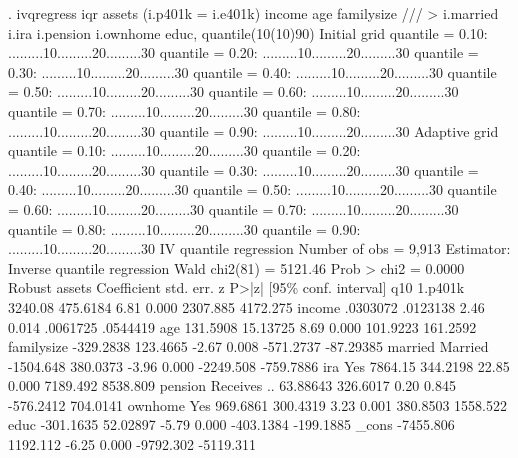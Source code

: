 . ivqregress iqr assets (i.p401k = i.e401k) income age familysize         ///
>         i.married i.ira i.pension i.ownhome educ, quantile(10(10)90)
{\smallskip}
Initial grid
    quantile = 0.10: .........10.........20.........30
    quantile = 0.20: .........10.........20.........30
    quantile = 0.30: .........10.........20.........30
    quantile = 0.40: .........10.........20.........30
    quantile = 0.50: .........10.........20.........30
    quantile = 0.60: .........10.........20.........30
    quantile = 0.70: .........10.........20.........30
    quantile = 0.80: .........10.........20.........30
    quantile = 0.90: .........10.........20.........30
{\smallskip}
Adaptive grid
    quantile = 0.10: .........10.........20.........30
    quantile = 0.20: .........10.........20.........30
    quantile = 0.30: .........10.........20.........30
    quantile = 0.40: .........10.........20.........30
    quantile = 0.50: .........10.........20.........30
    quantile = 0.60: .........10.........20.........30
    quantile = 0.70: .........10.........20.........30
    quantile = 0.80: .........10.........20.........30
    quantile = 0.90: .........10.........20.........30
{\smallskip}
IV quantile regression                                 Number of obs =   9,913
Estimator: Inverse quantile regression                 Wald chi2(81) = 5121.46
                                                       Prob > chi2   =  0.0000
{\smallskip}
             {\VBAR}               Robust
      assets {\VBAR} Coefficient  std. err.      z    P>|z|     [95\% conf. interval]
q10          {\VBAR}
     1.p401k {\VBAR}    3240.08   475.6184     6.81   0.000     2307.885    4172.275
      income {\VBAR}   .0303072   .0123138     2.46   0.014     .0061725    .0544419
         age {\VBAR}   131.5908   15.13725     8.69   0.000     101.9223    161.2592
  familysize {\VBAR}  -329.2838   123.4665    -2.67   0.008    -571.2737   -87.29385
             {\VBAR}
     married {\VBAR}
    Married  {\VBAR}  -1504.648   380.0373    -3.96   0.000    -2249.508   -759.7886
             {\VBAR}
         ira {\VBAR}
        Yes  {\VBAR}    7864.15   344.2198    22.85   0.000     7189.492    8538.809
             {\VBAR}
     pension {\VBAR}
Receives ..  {\VBAR}   63.88643   326.6017     0.20   0.845    -576.2412    704.0141
             {\VBAR}
     ownhome {\VBAR}
        Yes  {\VBAR}   969.6861   300.4319     3.23   0.001     380.8503    1558.522
        educ {\VBAR}  -301.1635   52.02897    -5.79   0.000    -403.1384   -199.1885
       _cons {\VBAR}  -7455.806   1192.112    -6.25   0.000    -9792.302   -5119.311
